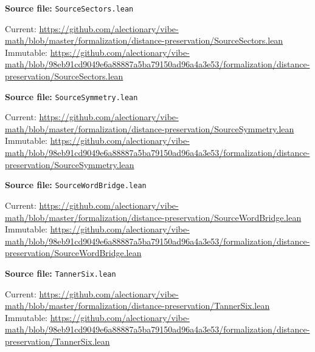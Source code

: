 \par\smallskip\noindent\begin{minipage}{\linewidth}\small\setlength{\baselineskip}{11pt}
\textbf{Source file:} \nolinkurl{SourceSectors.lean}\par\nopagebreak
Current: \url{https://github.com/alectionary/vibe-math/blob/master/formalization/distance-preservation/SourceSectors.lean}\\
Immutable: \url{https://github.com/alectionary/vibe-math/blob/98eb91cd9049e6a88887a5ba79150ad96a4a3e53/formalization/distance-preservation/SourceSectors.lean}\par\end{minipage}\par
\par\smallskip\noindent\begin{minipage}{\linewidth}\small\setlength{\baselineskip}{11pt}
\textbf{Source file:} \nolinkurl{SourceSymmetry.lean}\par\nopagebreak
Current: \url{https://github.com/alectionary/vibe-math/blob/master/formalization/distance-preservation/SourceSymmetry.lean}\\
Immutable: \url{https://github.com/alectionary/vibe-math/blob/98eb91cd9049e6a88887a5ba79150ad96a4a3e53/formalization/distance-preservation/SourceSymmetry.lean}\par\end{minipage}\par
\par\smallskip\noindent\begin{minipage}{\linewidth}\small\setlength{\baselineskip}{11pt}
\textbf{Source file:} \nolinkurl{SourceWordBridge.lean}\par\nopagebreak
Current: \url{https://github.com/alectionary/vibe-math/blob/master/formalization/distance-preservation/SourceWordBridge.lean}\\
Immutable: \url{https://github.com/alectionary/vibe-math/blob/98eb91cd9049e6a88887a5ba79150ad96a4a3e53/formalization/distance-preservation/SourceWordBridge.lean}\par\end{minipage}\par
\par\smallskip\noindent\begin{minipage}{\linewidth}\small\setlength{\baselineskip}{11pt}
\textbf{Source file:} \nolinkurl{TannerSix.lean}\par\nopagebreak
Current: \url{https://github.com/alectionary/vibe-math/blob/master/formalization/distance-preservation/TannerSix.lean}\\
Immutable: \url{https://github.com/alectionary/vibe-math/blob/98eb91cd9049e6a88887a5ba79150ad96a4a3e53/formalization/distance-preservation/TannerSix.lean}\par\end{minipage}\par
